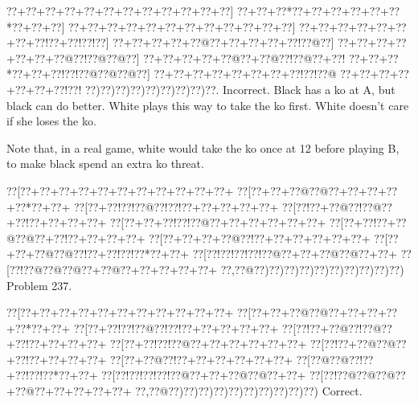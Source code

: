 \documentclass[a5paper]{article}
\begin{document}
\begin{center}
{\goo
\0??+\0??+\0??+\0??+\0??+\0??+\0??+\0??+\0??+\0??+\0??+\0??]
\0??+\0??+\0??*\0??+\0??+\0??+\0??+\0??+\0??*\0??+\0??+\0??]
\0??+\0??+\0??+\0??+\0??+\0??+\0??+\0??+\0??+\0??+\0??+\0??]
\0??+\0??+\0??+\0??+\0??+\0??+\0??+\0??!\0??+\0??!\0??!\0??]
\0??+\0??+\0??+\0??+\0??@\0??+\0??+\0??+\0??+\0??!\0??@\0??]
\0??+\0??+\0??+\0??+\0??+\0??+\0??@\0??!\0??@\0??@\0??]
\0??+\0??+\0??+\0??+\0??@\0??+\0??@\0??!\0??@\0??+\0??!
\0??+\0??+\0??*\0??+\0??+\0??!\0??!\0??@\0??@\0??@\0??]
\0??+\0??+\0??+\0??+\0??+\0??+\0??+\0??!\0??!\0??@
\0??+\0??+\0??+\0??+\0??+\0??+\0??!\0??!
\0??)\0??)\0??)\0??)\0??)\0??)\0??)\0??)\0??.
}
Incorrect. Black has a ko at A, but black can do better. White plays this way to take the ko first. White doesn't care if she loses the ko.

Note that, in a real game, white would take the ko once at 12 before playing B, to make black spend an extra ko threat.

\end{center}
\newpage
\begin{center}
{\goo
\0??[\0??+\0??+\0??+\0??+\0??+\0??+\0??+\0??+\0??+\0??+\0??+
\0??[\0??+\0??+\0??@\0??@\0??+\0??+\0??+\0??+\0??*\0??+\0??+
\0??[\0??+\0??!\0??!\0??@\0??!\0??!\0??+\0??+\0??+\0??+\0??+
\0??[\0??!\0??+\0??@\0??!\0??@\0??+\0??!\0??+\0??+\0??+\0??+
\0??[\0??+\0??+\0??!\0??!\0??@\0??+\0??+\0??+\0??+\0??+\0??+
\0??[\0??+\0??!\0??+\0??@\0??@\0??+\0??!\0??+\0??+\0??+\0??+
\0??[\0??+\0??+\0??+\0??@\0??!\0??+\0??+\0??+\0??+\0??+\0??+
\0??[\0??+\0??+\0??@\0??@\0??!\0??+\0??!\0??!\0??*\0??+\0??+
\0??[\0??!\0??!\0??!\0??!\0??@\0??+\0??+\0??@\0??@\0??+\0??+
\0??[\0??!\0??@\0??@\0??@\0??+\0??@\0??+\0??+\0??+\0??+\0??+
\0??,\0??@\0??)\0??)\0??)\0??)\0??)\0??)\0??)\0??)\0??)\0??)
}
Problem 237.

\end{center}
\begin{center}
{\goo
\0??[\0??+\0??+\0??+\0??+\0??+\0??+\0??+\0??+\0??+\0??+\0??+
\0??[\0??+\0??+\0??@\0??@\0??+\0??+\0??+\0??+\0??*\0??+\0??+
\0??[\0??+\0??!\0??!\0??@\0??!\0??!\0??+\0??+\0??+\0??+\0??+
\0??[\0??!\0??+\0??@\0??!\0??@\0??+\0??!\0??+\0??+\0??+\0??+
\0??[\0??+\0??!\0??!\0??@\0??+\0??+\0??+\0??+\0??+\0??+
\0??[\0??!\0??+\0??@\0??@\0??+\0??!\0??+\0??+\0??+\0??+
\0??[\0??+\0??@\0??!\0??+\0??+\0??+\0??+\0??+\0??+
\0??[\0??@\0??@\0??!\0??+\0??!\0??!\0??*\0??+\0??+
\0??[\0??!\0??!\0??!\0??!\0??@\0??+\0??+\0??@\0??@\0??+\0??+
\0??[\0??!\0??@\0??@\0??@\0??+\0??@\0??+\0??+\0??+\0??+\0??+
\0??,\0??@\0??)\0??)\0??)\0??)\0??)\0??)\0??)\0??)\0??)\0??)
}
Correct. 

\end{center}
\end{document}
